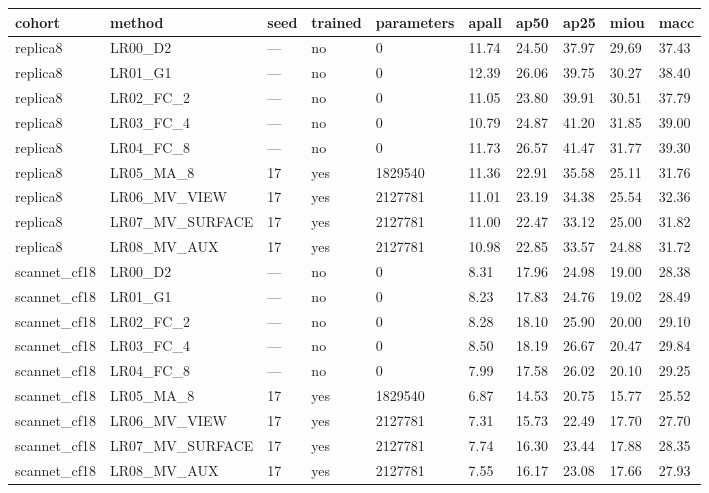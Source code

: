 \begin{tabular}{llllllllll}
\toprule
cohort & method & seed & trained & parameters & apall & ap50 & ap25 & miou & macc \\
\midrule
replica8 & LR00\_D2 & — & no & 0 & 11.74 & 24.50 & 37.97 & 29.69 & 37.43 \\
replica8 & LR01\_G1 & — & no & 0 & 12.39 & 26.06 & 39.75 & 30.27 & 38.40 \\
replica8 & LR02\_FC\_2 & — & no & 0 & 11.05 & 23.80 & 39.91 & 30.51 & 37.79 \\
replica8 & LR03\_FC\_4 & — & no & 0 & 10.79 & 24.87 & 41.20 & 31.85 & 39.00 \\
replica8 & LR04\_FC\_8 & — & no & 0 & 11.73 & 26.57 & 41.47 & 31.77 & 39.30 \\
replica8 & LR05\_MA\_8 & 17 & yes & 1829540 & 11.36 & 22.91 & 35.58 & 25.11 & 31.76 \\
replica8 & LR06\_MV\_VIEW & 17 & yes & 2127781 & 11.01 & 23.19 & 34.38 & 25.54 & 32.36 \\
replica8 & LR07\_MV\_SURFACE & 17 & yes & 2127781 & 11.00 & 22.47 & 33.12 & 25.00 & 31.82 \\
replica8 & LR08\_MV\_AUX & 17 & yes & 2127781 & 10.98 & 22.85 & 33.57 & 24.88 & 31.72 \\
scannet\_cf18 & LR00\_D2 & — & no & 0 & 8.31 & 17.96 & 24.98 & 19.00 & 28.38 \\
scannet\_cf18 & LR01\_G1 & — & no & 0 & 8.23 & 17.83 & 24.76 & 19.02 & 28.49 \\
scannet\_cf18 & LR02\_FC\_2 & — & no & 0 & 8.28 & 18.10 & 25.90 & 20.00 & 29.10 \\
scannet\_cf18 & LR03\_FC\_4 & — & no & 0 & 8.50 & 18.19 & 26.67 & 20.47 & 29.84 \\
scannet\_cf18 & LR04\_FC\_8 & — & no & 0 & 7.99 & 17.58 & 26.02 & 20.10 & 29.25 \\
scannet\_cf18 & LR05\_MA\_8 & 17 & yes & 1829540 & 6.87 & 14.53 & 20.75 & 15.77 & 25.52 \\
scannet\_cf18 & LR06\_MV\_VIEW & 17 & yes & 2127781 & 7.31 & 15.73 & 22.49 & 17.70 & 27.70 \\
scannet\_cf18 & LR07\_MV\_SURFACE & 17 & yes & 2127781 & 7.74 & 16.30 & 23.44 & 17.88 & 28.35 \\
scannet\_cf18 & LR08\_MV\_AUX & 17 & yes & 2127781 & 7.55 & 16.17 & 23.08 & 17.66 & 27.93 \\
\bottomrule
\end{tabular}
